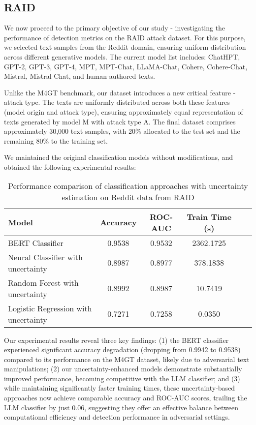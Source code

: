 \documentclass[a4paper, 12pt]{article}
\begin{document}
\subsection{RAID}

We now proceed to the primary objective of our study - investigating the performance of detection metrics on the RAID attack dataset. For this purpose, we selected text samples from the Reddit domain, ensuring uniform distribution across different generative models. The current model list includes: ChatHPT, GPT-2, GPT-3, GPT-4, MPT, MPT-Chat, LLaMA-Chat, Cohere, Cohere-Chat, Mistral, Mistral-Chat, and human-authored texts.

Unlike the M4GT benchmark, our dataset introduces a new critical feature - attack type. The texts are uniformly distributed across both these features (model origin and attack type), ensuring approximately equal representation of texts generated by model M with attack type A. The final dataset comprises approximately 30,000 text samples, with 20\% allocated to the test set and the remaining 80\% to the training set.

We maintained the original classification models without modifications, and obtained the following experimental results:

\begin{table}[ht]
\centering
\begin{tabular}{|l|c|c|c|c|c|}
\hline
\textbf{Model} & \textbf{Accuracy} & \textbf{ROC-AUC} & \textbf{Train Time (s)} \\
\hline
BERT Classifier & 0.9538 & 0.9532 & 2362.1725 \\
Neural Classifier with uncertainty & 0.8987 & 0.8977 & 378.1838 \\
Random Forest with uncertainty & 0.8992 & 0.8987 & 10.7419 \\
Logistic Regression with uncertainty & 0.7271 & 0.7258 & 0.0350 \\
\hline
\end{tabular}
\caption{Performance comparison of classification approaches with uncertainty estimation on Reddit data from RAID}
\label{tab:model-performance-comparison}
\end{table}

Our experimental results reveal three key findings: (1) the BERT classifier experienced significant accuracy degradation (dropping from 0.9942 to 0.9538) compared to its performance on the M4GT dataset, likely due to adversarial text manipulations; (2) our uncertainty-enhanced models demonstrate substantially improved performance, becoming competitive with the LLM classifier; and (3) while maintaining significantly faster training times, these uncertainty-based approaches now achieve comparable accuracy and ROC-AUC scores, trailing the LLM classifier by just 0.06, suggesting they offer an effective balance between computational efficiency and detection performance in adversarial settings.
\end{document}
